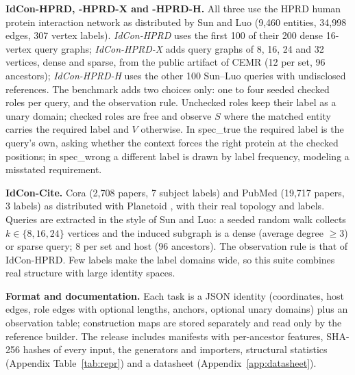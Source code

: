 \textbf{IdCon-HPRD, -HPRD-X and -HPRD-H.} All three use the HPRD human protein interaction network as distributed by Sun and Luo \cite{sunluo,hprd} (9,460 entities, 34,998 edges, 307 vertex labels). \emph{IdCon-HPRD} uses the first 100 of their 200 dense 16-vertex query graphs; \emph{IdCon-HPRD-X} adds query graphs of 8, 16, 24 and 32 vertices, dense and sparse, from the public artifact of CEMR \cite{cemr} (12 per set, 96 ancestors); \emph{IdCon-HPRD-H} uses the other 100 Sun--Luo queries with undisclosed references. The benchmark adds two choices only: one to four seeded checked roles per query, and the observation rule. Unchecked roles keep their label as a unary domain; checked roles are free and observe $S$ where the matched entity carries the required label and $V$ otherwise. In \textsf{spec\_true} the required label is the query's own, asking whether the context forces the right protein at the checked positions; in \textsf{spec\_wrong} a different label is drawn by label frequency, modeling a misstated requirement.

\textbf{IdCon-Cite.} Cora (2,708 papers, 7 subject labels) \cite{cora} and PubMed (19,717 papers, 3 labels) \cite{pubmed} as distributed with Planetoid \cite{planetoid}, with their real topology and labels. Queries are extracted in the style of Sun and Luo: a seeded random walk collects $k\in\{8,16,24\}$ vertices and the induced subgraph is a dense (average degree $\ge 3$) or sparse query; 8 per set and host (96 ancestors). The observation rule is that of IdCon-HPRD. Few labels make the label domains wide, so this suite combines real structure with large identity spaces.

\textbf{Format and documentation.} Each task is a JSON identity (coordinates, host edges, role edges with optional lengths, anchors, optional unary domains) plus an observation table; construction maps are stored separately and read only by the reference builder. The release includes manifests with per-ancestor features, SHA-256 hashes of every input, the generators and importers, structural statistics (Appendix Table~\ref{tab:repr}) and a datasheet (Appendix~\ref{app:datasheet}).

